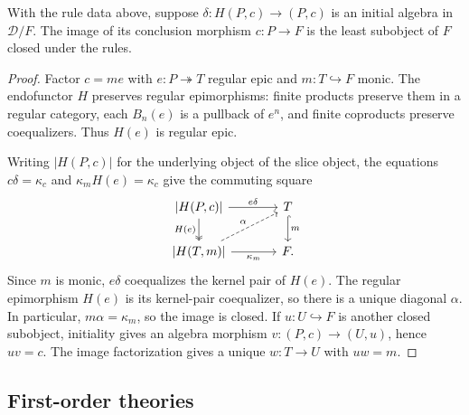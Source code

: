 \begin{theorem}\label{thm:least-theorem-subobject}
With the rule data above, suppose
$\delta:H(P,c)\to(P,c)$ is an initial algebra in $\mathcal D/F$.
The image of its conclusion morphism $c:P\to F$ is the least
subobject of $F$ closed under the rules.
\end{theorem}
\begin{proof}
Factor $c=me$ with $e:P\twoheadrightarrow T$ regular epic and
$m:T\hookrightarrow F$ monic. The endofunctor $H$ preserves
regular epimorphisms: finite products preserve them in a regular
category, each $B_n(e)$ is a pullback of $e^n$, and finite coproducts
preserve coequalizers. Thus $H(e)$ is regular epic.

Writing $|H(P,c)|$ for the underlying object of the slice object,
the equations $c\delta=\kappa_c$ and
$\kappa_mH(e)=\kappa_c$ give the commuting square
\[
\begin{tikzcd}[column sep=large]
 \lvert H(P,c)\rvert\arrow[r,"e\delta"]\arrow[d,two heads,"H(e)"'] &
 T\arrow[d,hook,"m"]\\
 \lvert H(T,m)\rvert\arrow[r,"\kappa_m"']\arrow[ur,dashed,"\alpha"] & F.
\end{tikzcd}
\]
Since $m$ is monic, $e\delta$ coequalizes the kernel pair of $H(e)$.
The regular epimorphism $H(e)$ is its kernel-pair coequalizer, so
there is a unique diagonal $\alpha$. In particular, $m\alpha=\kappa_m$,
so the image is closed. If $u:U\hookrightarrow F$ is another
closed subobject, initiality gives an algebra morphism
$v:(P,c)\to(U,u)$, hence $uv=c$. The image factorization gives
a unique $w:T\to U$ with $uw=m$.
\end{proof}

\subsection{First-order theories}
\label{app:first-order-derivations}

